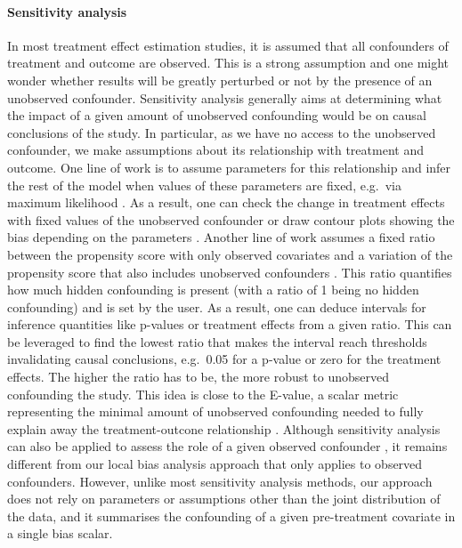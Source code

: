 \documentclass{article}
\theoremstyle{plain}
\theoremstyle{definition}
\theoremstyle{remark}
\theoremstyle{mystyle}
\begin{document}
 


\paragraph{Sensitivity analysis}

In most treatment effect estimation studies, it is assumed that all confounders of treatment and outcome are observed. This is a strong assumption and one might wonder whether results will be greatly perturbed or not by the presence of an unobserved confounder. Sensitivity analysis generally aims at determining what the impact of a given amount of unobserved confounding would be on causal conclusions of the study. In particular, as we have no access to the unobserved confounder, we make assumptions about its relationship with treatment and outcome. One line of work is to assume parameters for this relationship and infer the rest of the model when values of these parameters are fixed, e.g.~via maximum likelihood . As a result, one can check the change in treatment effects with fixed values of the unobserved confounder  or draw contour plots showing the bias depending on the parameters . Another line of work assumes a fixed ratio between the propensity score with only observed covariates and a variation of the propensity score that also includes unobserved confounders . This ratio quantifies how much hidden confounding is present (with a ratio of 1 being no hidden confounding) and is set by the user. As a result, one can deduce intervals for inference quantities like p-values or treatment effects from a given ratio. This can be leveraged to find the lowest ratio that makes the interval reach thresholds invalidating causal conclusions, e.g.~0.05 for a p-value or zero for the treatment effects. The higher the ratio has to be, the more robust to unobserved confounding the study. This idea is close to the E-value, a scalar metric representing the minimal amount of unobserved confounding needed to fully explain away the treatment-outcone relationship . Although sensitivity analysis can also be applied to assess the role of a given observed confounder , it remains different from our local bias analysis approach that only applies to observed confounders. However, unlike most sensitivity analysis methods, our approach does not rely on parameters or assumptions other than the joint distribution of the data, and it summarises the confounding of a given pre-treatment covariate in a single bias scalar.
\end{document}
